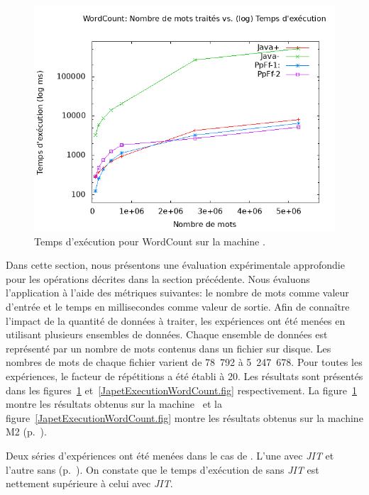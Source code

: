 \begin{figure}[H]
\centering
     \includegraphics[width=1.0\textwidth]{Figures/GrapheTempsWordCount.png}
      \caption{Temps d'ex\'ecution pour WordCount sur la machine .}
       \label{GrapheTempsWordCount.fig}
\end{figure}



Dans cette section, nous présentons une \'evaluation exp\'erimentale approfondie pour les op\'erations d\'ecrites dans la section pr\'ec\'edente. Nous \'evaluons l'application  \`a l'aide des m\'etriques suivantes: le nombre de mots comme valeur d'entr\'ee et le temps en millisecondes comme valeur de sortie. Afin de conna\^itre l'impact de la quantit\'e de donn\'ees \`a traiter, les exp\'eriences ont \'et\'e men\'ees en utilisant plusieurs ensembles de donn\'ees. Chaque ensemble de donn\'ees est repr\'esent\'e par un nombre de mots contenus dans un fichier sur disque. Les nombres de mots de chaque fichier varient de 78~792 \`a 5~247~678. Pour toutes les exp\'eriences, le facteur de r\'ep\'etitions a \'et\'e \'etabli \`a 20.  Les r\'esultats sont pr\'esent\'es dans les figures~\ref{GrapheTempsWordCount.fig} et~\ref{JapetExecutionWordCount.fig} respectivement. La figure~\ref{GrapheTempsWordCount.fig} montre les résultats obtenus sur la machine \ et la figure~\ref{JapetExecutionWordCount.fig} montre les r\'esultats obtenus sur la machine M2 (p.~\pageref{machines.sect}).

Deux s\'eries d'exp\'eriences ont \'et\'e men\'ees dans le cas de . L'une avec \emph{JIT} et l'autre sans (p.~\pageref{jitDescription.sect}). On constate que le temps d'ex\'ecution de  sans \emph{JIT} est nettement sup\'erieure \`a celui avec \emph{JIT}.

